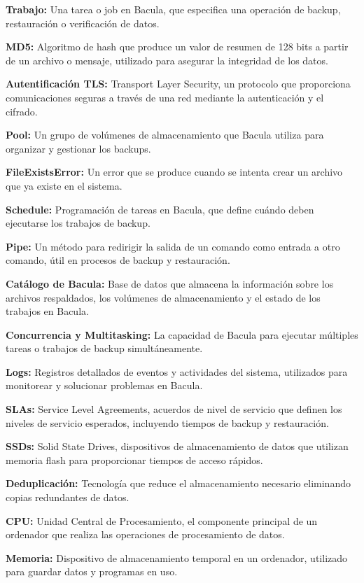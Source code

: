 \documentclass[12pt,a4paper]{article}
\begin{document}
\textbf{Trabajo:} Una tarea o job en Bacula, que especifica una operación de backup, restauración o verificación de datos.

\textbf{MD5:} Algoritmo de hash que produce un valor de resumen de 128 bits a partir de un archivo o mensaje, utilizado para asegurar la integridad de los datos.

\textbf{Autentificación TLS:} Transport Layer Security, un protocolo que proporciona comunicaciones seguras a través de una red mediante la autenticación y el cifrado.

\textbf{Pool:} Un grupo de volúmenes de almacenamiento que Bacula utiliza para organizar y gestionar los backups.

\textbf{FileExistsError:} Un error que se produce cuando se intenta crear un archivo que ya existe en el sistema.

\textbf{Schedule:} Programación de tareas en Bacula, que define cuándo deben ejecutarse los trabajos de backup.

\textbf{Pipe:} Un método para redirigir la salida de un comando como entrada a otro comando, útil en procesos de backup y restauración.

\textbf{Catálogo de Bacula:} Base de datos que almacena la información sobre los archivos respaldados, los volúmenes de almacenamiento y el estado de los trabajos en Bacula.

\textbf{Concurrencia y Multitasking:} La capacidad de Bacula para ejecutar múltiples tareas o trabajos de backup simultáneamente.

\textbf{Logs:} Registros detallados de eventos y actividades del sistema, utilizados para monitorear y solucionar problemas en Bacula.

\textbf{SLAs:} Service Level Agreements, acuerdos de nivel de servicio que definen los niveles de servicio esperados, incluyendo tiempos de backup y restauración.

\textbf{SSDs:} Solid State Drives, dispositivos de almacenamiento de datos que utilizan memoria flash para proporcionar tiempos de acceso rápidos.

\textbf{Deduplicación:} Tecnología que reduce el almacenamiento necesario eliminando copias redundantes de datos.

\textbf{CPU:} Unidad Central de Procesamiento, el componente principal de un ordenador que realiza las operaciones de procesamiento de datos.

\textbf{Memoria:} Dispositivo de almacenamiento temporal en un ordenador, utilizado para guardar datos y programas en uso.
\end{document}
